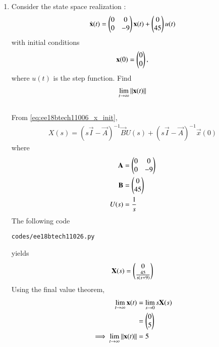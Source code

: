 \begin{enumerate}[label=\thesubsection.\arabic*.,ref=\thesubsection.\theenumi]

\item
Consider the state space realization : 
\begin{align}
  \dot{ \mathbf{x}}(t)=\begin{pmatrix}0&0\\0&-9\end{pmatrix}\mathbf{x}(t) + \begin{pmatrix}0\\45\end{pmatrix}u(t)   
\end{align}
with initial conditions 
\begin{align}
\mathbf{x}(0) = \begin{pmatrix}0\\0\end{pmatrix},
\end{align}
 where $u(t)$ is the step function.  Find 
\begin{align}
\lim _ {t \to \infty}\left\lVert\mathbf{x}(t)\right\rVert
\end{align}
\\
\solution
From \eqref{eq:ee18btech11006_x_init},
\begin{align}
     X(s)={(s\vec{I}-\vec{A})^{-1}}\vec{B} U(s)+ (s\vec{I}-\vec{A})^{-1}\vec{x}(0)
\end{align}
where
\begin{align}
     \mathbf{A} &=    \begin{pmatrix}0&0\\0&-9\end{pmatrix}\\
     \mathbf{B} &=    \begin{pmatrix}0 \\ 45\end{pmatrix}\\
U(s) &= \frac{1}{s}
\end{align}
%
The following code 
\begin{lstlisting}
codes/ee18btech11026.py
\end{lstlisting}
yields 
%
\begin{align}
   \mathbf{X}(s) = \begin{pmatrix}0\\\frac{45}{s(s+9)}\end{pmatrix}    
\end{align}
Using the final value theorem,  
\begin{align}
\lim _ {t \to \infty}\mathbf{x}(t) &= \lim _ {s \to 0}s\mathbf{X}(s) 
\\
&= \begin{pmatrix}0\\5\end{pmatrix} 
\\
\implies \lim _ {t \to \infty}\left\lVert\mathbf{x}(t)\right\rVert &= 5
\end{align}


\end{enumerate}
